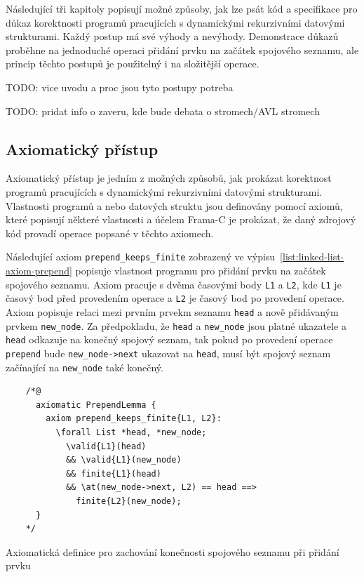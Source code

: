 Následující tři kapitoly popisují možné způsoby,
jak lze psát kód a specifikace pro důkaz korektnosti programů pracujících
s dynamickými rekurzivními datovými strukturami.
Každý postup má své výhody a nevýhody.
Demonstrace důkazů proběhne na jednoduché operaci přidání prvku na začátek spojového seznamu,
ale princip těchto postupů je použitelný i na složitější operace.

TODO: vice uvodu a proc jsou tyto postupy potreba

TODO: pridat info o zaveru, kde bude debata o stromech/AVL stromech

\subsection{Axiomatický přístup}
\label{subsec:axiomaticky-pristup}

Axiomatický přístup je jedním z možných způsobů,
jak prokázat korektnost programů pracujících s dynamickými rekurzivními datovými strukturami.
Vlastnosti programů a nebo datových struktu jsou definovány pomocí axiomů,
které popisují některé vlastnosti a účelem Frama\mbox{-}C je prokázat,
že daný zdrojový kód provadí operace popsané v těchto axiomech.

Následující axiom \texttt{prepend\_keeps\_finite} zobrazený ve výpisu~\ref{list:linked-list-axiom-prepend}
popisuje vlastnost programu pro přidání prvku na začátek spojového seznamu.
Axiom pracuje s dvěma časovými body \texttt{L1} a \texttt{L2},
kde \texttt{L1} je časový bod před provedením operace
a \texttt{L2} je časový bod po provedení operace.
Axiom popisuje relaci mezi prvním prvekm seznamu \texttt{head} a nově přidávaným prvkem \texttt{new\_node}.
Za předpokladu, že \texttt{head} a \texttt{new\_node} jsou platné ukazatele
a \texttt{head} odkazuje na konečný spojový seznam,
tak pokud po provedení operace \texttt{prepend} bude \texttt{new\_node->next} ukazovat na \texttt{head},
musí být spojový seznam začínající na \texttt{new\_node} také konečný.

\begin{listing}[H]
    \begin{verbatim}
    /*@
      axiomatic PrependLemma {
        axiom prepend_keeps_finite{L1, L2}:
          \forall List *head, *new_node;
            \valid{L1}(head)
            && \valid{L1}(new_node)
            && finite{L1}(head)
            && \at(new_node->next, L2) == head ==>
              finite{L2}(new_node);
      }
    */
    \end{verbatim}
    \caption{Axiomatická definice pro zachování konečnosti spojového seznamu při přidání prvku}
    \label{list:linked-list-axiom-prepend}
\end{listing}

